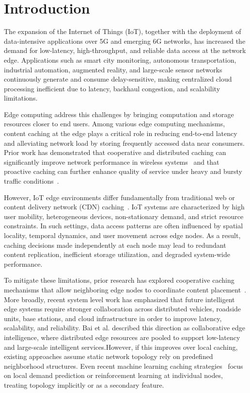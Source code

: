 \section{Introduction}

The expansion of the Internet of Things (IoT), together with the deployment of data-intensive applications over 5G and emerging 6G networks, has increased the demand for low-latency, high-throughput, and reliable data access at the network edge. Applications such as smart city monitoring, autonomous transportation, industrial automation, augmented reality, and large-scale sensor networks continuously generate and consume delay-sensitive, making centralized cloud processing inefficient due to latency, backhaul congestion, and scalability limitations.

Edge computing address this challenges by bringing computation and storage resources closer to end users. Among various edge computing mechanisms, content caching at the edge plays a critical role in reducing end-to-end latency and alleviating network load by storing frequently accessed data near consumers. Prior work has demonstrated that cooperative and distributed caching can significantly improve network performance in wireless systems~\cite{Shanmugam2013} and that proactive caching can further enhance quality of service under heavy and bursty traffic conditions~\cite{Bastug2014}.

However, IoT edge environments differ fundamentally from traditional web or content delivery network (CDN) caching~\cite{Podlipnig2003}. IoT systems are characterized by high user mobility, heterogeneous devices, non-stationary demand, and strict resource constraints. In such settings, data access patterns are often influenced by spatial locality, temporal dynamics, and user movement across edge nodes. As a result, caching decisions made independently at each node may lead to redundant content replication, inefficient storage utilization, and degraded system-wide performance.

To mitigate these limitations, prior research has explored cooperative caching mechanisms that allow neighboring edge nodes to coordinate content placement~\cite{Shanmugam2013}. More broadly, recent system level work has emphasized that future intelligent edge systems require stronger collaboration across distributed vehicles, roadside units, base stations, and cloud infrastructure in order to improve latency, scalability, and reliability. Bai et al. \cite{bai2025collaborative}described this direction as collaborative edge intelligence, where distributed edge resources are pooled to support low-latency and large-scale intelligent services.However, if this improves over local caching, existing approaches assume static network topology rely on predefined neighborhood structures. Even recent machine learning caching strategies~\cite{Shuja2021JNCA} focus on local demand prediction or reinforcement learning at individual nodes, treating topology implicitly or as a secondary feature.

